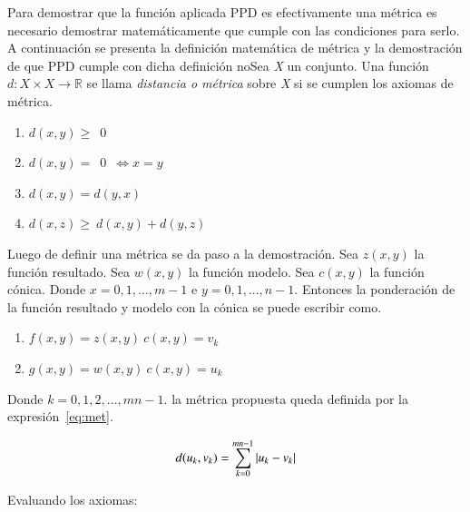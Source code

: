 Para demostrar que la función aplicada PPD es efectivamente una métrica es necesario demostrar matemáticamente que cumple con las condiciones para serlo. A continuación se presenta la definición matemática de métrica y la demostración de que PPD cumple con dicha definición
noSea \textit{X} un conjunto. Una función \(d:X\times X\rightarrow \mathbb{R}\) se llama \textit{distancia o métrica} sobre \textit{X} si se cumplen los axiomas de métrica.

\begin{enumerate}
\item \(d(x,y)\geq\)~0
\item \(d(x,y) = \)~0~\(\Leftrightarrow x=y\)
\item \(d(x,y)=d(y,x)\)
\item \(d(x,z)\geq~d(x,y)+d(y,z)\)
\end{enumerate}

Luego de definir una métrica se da paso a la demostración. Sea \(z(x,y)\) la función resultado. Sea \(w(x,y)\) la función modelo. Sea \(c(x,y)\) la función cónica. Donde \(x = 0,1,...,m-1\) e \(y = 0,1,...,n-1\). Entonces la ponderación de la función resultado y modelo con la cónica se puede escribir como.


\begin{enumerate}
\item \(f(x,y) = z(x,y)\ c(x,y) = v_{k}\)
\item \(g(x,y) = w(x,y)\ c(x,y) = u_{k}\)
\end{enumerate}

Donde \(k = 0, 1, 2, ..., mn-1.\) la métrica propuesta queda definida por la expresión~\ref{eq:met}.

\begin{equation}
\centering
\label{eq:met}
 d(u_{k},v_{k})=\sum_{k=0}^{mn-1} \left | u_{k}- v_{k}\right |
\end{equation}

Evaluando los axiomas:
 

